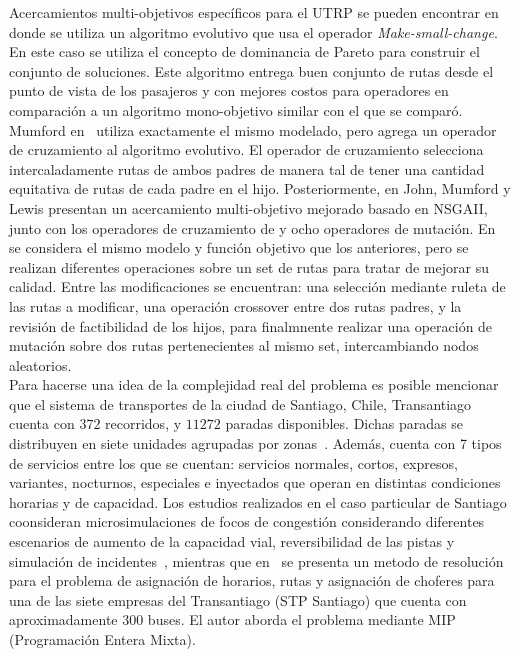 Acercamientos multi-objetivos espec\'ificos para el UTRP se pueden encontrar en~\cite{zhang2010multi} donde se utiliza un algoritmo
evolutivo que usa el operador \emph{Make-small-change}. En este caso se utiliza el concepto de dominancia de Pareto para construir
el conjunto de soluciones. Este algoritmo entrega buen conjunto de rutas desde el punto de vista de los pasajeros y con mejores costos
para operadores en comparaci\'on a un algoritmo mono-objetivo similar con el que se compar\'o. Mumford en~\cite{NewHaEOps} utiliza exactamente
el mismo modelado, pero agrega un operador de cruzamiento al algoritmo evolutivo. El operador de cruzamiento selecciona intercaladamente
rutas de ambos padres de manera tal de tener una cantidad equitativa de rutas de cada padre en el hijo. Posteriormente, en \cite{john2014improved} John, Mumford y Lewis presentan un acercamiento multi-objetivo mejorado basado en NSGAII, junto con los operadores de cruzamiento de \cite{NewHaEOps} y ocho operadores de mutación. En~\cite{GAUTRP}
se considera el mismo modelo y funci\'on objetivo que los anteriores, pero 
se realizan diferentes operaciones sobre un set de rutas para tratar de mejorar su calidad. Entre las modificaciones
se encuentran: una selecci\'on mediante ruleta de las rutas a modificar, una operaci\'on crossover entre dos rutas padres,
y la revisi\'on de factibilidad de los hijos, para finalmnente realizar una operaci\'on de mutaci\'on sobre dos rutas pertenecientes
al mismo set, intercambiando nodos aleatorios.\\

Para hacerse una idea de la complejidad real del problema es posible mencionar que el sistema de transportes de la ciudad de Santiago, Chile,
Transantiago cuenta con $372$ recorridos, y $11272$ paradas disponibles. Dichas paradas se distribuyen en siete unidades agrupadas por
zonas~\cite{datosGob}. Adem\'as, cuenta con 7 tipos de servicios entre los que se cuentan: servicios normales, cortos, expresos, variantes,
nocturnos, especiales e inyectados que operan en distintas condiciones horarias y de capacidad. Los estudios realizados en el caso
particular de Santiago coonsideran microsimulaciones de focos de congesti\'on considerando
diferentes escenarios de aumento de la capacidad vial, reversibilidad de las pistas y simulaci\'on de incidentes~\cite{alarcon2010}, 
mientras que en~\cite{cortes2009} se presenta un metodo de resoluci\'on para el problema de asignaci\'on de horarios, rutas y asignaci\'on
de choferes para una de las siete empresas del Transantiago (STP Santiago) que cuenta con aproximadamente 300 buses.
El autor aborda el problema mediante MIP (Programaci\'on Entera Mixta).
